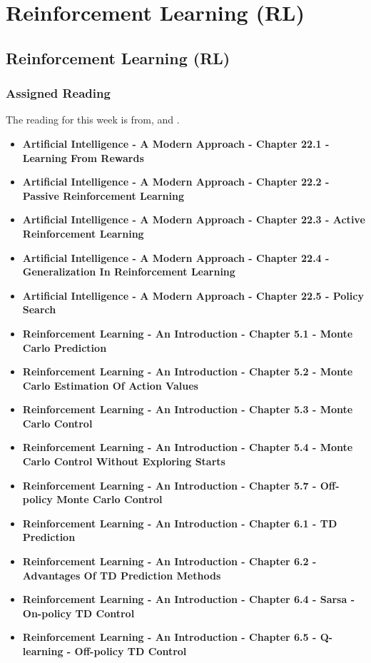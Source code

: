 \clearpage

\renewcommand{\ChapTitle}{Reinforcement Learning (RL)}
\renewcommand{\SectionTitle}{Reinforcement Learning (RL)}

\chapter{\ChapTitle}

\section{\SectionTitle}

\subsection{Assigned Reading}

The reading for this week is from, \AITextbook \hspace*{1pt} and \RLTextbook.

\begin{itemize}
    \item \textbf{Artificial Intelligence - A Modern Approach - Chapter 22.1 - Learning From Rewards}
    \item \textbf{Artificial Intelligence - A Modern Approach - Chapter 22.2 - Passive Reinforcement Learning}
    \item \textbf{Artificial Intelligence - A Modern Approach - Chapter 22.3 - Active Reinforcement Learning}
    \item \textbf{Artificial Intelligence - A Modern Approach - Chapter 22.4 - Generalization In Reinforcement Learning}
    \item \textbf{Artificial Intelligence - A Modern Approach - Chapter 22.5 - Policy Search}
    \item \textbf{Reinforcement Learning - An Introduction - Chapter 5.1 - Monte Carlo Prediction}
    \item \textbf{Reinforcement Learning - An Introduction - Chapter 5.2 - Monte Carlo Estimation Of Action Values}
    \item \textbf{Reinforcement Learning - An Introduction - Chapter 5.3 - Monte Carlo Control}
    \item \textbf{Reinforcement Learning - An Introduction - Chapter 5.4 - Monte Carlo Control Without Exploring Starts}
    \item \textbf{Reinforcement Learning - An Introduction - Chapter 5.7 - Off-policy Monte Carlo Control}
    \item \textbf{Reinforcement Learning - An Introduction - Chapter 6.1 - TD Prediction}
    \item \textbf{Reinforcement Learning - An Introduction - Chapter 6.2 - Advantages Of TD Prediction Methods}
    \item \textbf{Reinforcement Learning - An Introduction - Chapter 6.4 - Sarsa - On-policy TD Control}
    \item \textbf{Reinforcement Learning - An Introduction - Chapter 6.5 - Q-learning - Off-policy TD Control}
\end{itemize}

